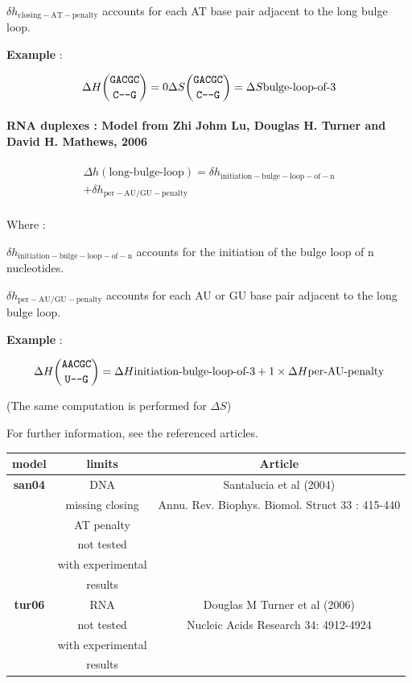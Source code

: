 \documentclass{article}
\begin{document}
$\delta{}h_\mathrm{closing-AT-penalty}$ accounts for each AT base pair adjacent
to the long bulge loop.

\textbf{Example} :

\begin{multline*}
\Delta H {\mbox{\texttt{GACGC}} \choose \mbox{\texttt{C---G}}} =
0
\Delta S {\mbox{\texttt{GACGC}} \choose \mbox{\texttt{C---G}}} =
\Delta S {\mbox{bulge-loop-of-3}} \\
\end{multline*}

\paragraph{RNA duplexes : \textbf{Model from Zhi Johm Lu, Douglas H. Turner and David H. Mathews, 2006}} 

\begin{multline*}
\Delta h {(\mbox{long-bulge-loop})} =
\delta{}h_\mathrm{initiation-bulge-loop-of-n} \\ +
\delta{}h_\mathrm{per-AU/GU-penalty}\\
\end{multline*}


Where :

$\delta{}h_\mathrm{initiation-bulge-loop-of-n}$ accounts for the initiation of the bulge loop of n nucleotides.

$\delta{}h_\mathrm{per-AU/GU-penalty}$ accounts for each AU or GU base pair adjacent
to the long bulge loop.


\textbf{Example} :

\begin{multline*}
\Delta H {\mbox{\texttt{AACGC}} \choose \mbox{\texttt{U---G}}} =
\Delta H {\mbox{initiation-bulge-loop-of-3}} +
1 \times \Delta H {\mbox{per-AU-penalty}} \\
\end{multline*}

       (The same computation is performed for $\Delta S$) 

For further information, see the referenced articles.

\begin{table}[hc]
\begin{tabular}[h]{| c | c | c |}
\textbf{model} & \textbf{limits} & \textbf{Article} \\
\hline
\textbf{san04} & DNA & Santalucia et al (2004)\\
 & missing closing & Annu. Rev. Biophys. Biomol. Struct 33 : 415-440\\
 & AT penalty & \\
 & not tested & \\
 & with experimental & \\
 & results & \\
 \hline
\textbf{tur06} & RNA & Douglas M Turner et al (2006)\\
 & not tested & Nucleic Acids Research 34: 4912-4924 \\
 & with experimental & \\
 & results & \\
 \hline
\end{tabular}
\end{table}
\end{document}
